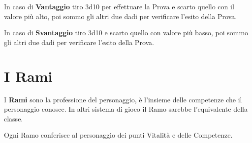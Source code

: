 \documentclass[12pt,a4paper,twoside,openany]{book}
\begin{document}
\begin{multicols}{2}
In caso di \textbf{Vantaggio} tiro 3d10 per effettuare la Prova e scarto quello con il valore più alto, poi sommo gli altri due dadi per verificare l'esito della Prova.

In caso di \textbf{Svantaggio} tiro 3d10 e scarto quello con valore più basso, poi sommo gli altri due dadi per verificare l'esito della Prova. 



\end{multicols}

\pagebreak




\section{I Rami}

\begin{multicols}{2}

I \textbf{Rami} sono la professione del personaggio, è l'insieme delle competenze che il personaggio conosce. In altri sistema di gioco il Ramo sarebbe l'equivalente della classe.

Ogni Ramo conferisce al personaggio dei punti Vitalità e delle Competenze.


	
\end{multicols}

\pagebreak
\end{document}
